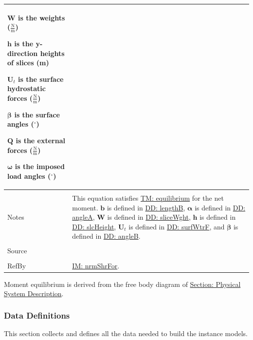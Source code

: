 \documentclass[12pt]{article}
\begin{document}
\begin{minipage}{\textwidth}
\begin{tabular}{p{} p{}}
\begin{symbDescription}
              \item{$\mathbf{W}$ is the weights ($\frac{\text{N}}{\text{m}}$)}
              \item{$\mathbf{h}$ is the y-direction heights of slices (m)}
              \item{${\mathbf{U}_{t}}$ is the surface hydrostatic forces ($\frac{\text{N}}{\text{m}}$)}
              \item{$\mathbf{β}$ is the surface angles (${}^{\circ}$)}
              \item{$\mathbf{Q}$ is the external forces ($\frac{\text{N}}{\text{m}}$)}
              \item{$\mathbf{ω}$ is the imposed load angles (${}^{\circ}$)}
              \end{symbDescription}
\\ \midrule \\
Notes & This equation satisfies \hyperref[TM:equilibrium]{TM: equilibrium} for the net moment. $\mathbf{b}$ is defined in \hyperref[DD:lengthB]{DD: lengthB}, $\mathbf{α}$ is defined in \hyperref[DD:angleA]{DD: angleA}, $\mathbf{W}$ is defined in \hyperref[DD:sliceWght]{DD: sliceWght}, $\mathbf{h}$ is defined in \hyperref[DD:slcHeight]{DD: slcHeight}, ${\mathbf{U}_{t}}$ is defined in \hyperref[DD:surfWtrF]{DD: surfWtrF}, and $\mathbf{β}$ is defined in \hyperref[DD:angleB]{DD: angleB}.
\\ \midrule \\
Source & \cite{chen2005}
\\ \midrule \\
RefBy & \hyperref[IM:nrmShrFor]{IM: nrmShrFor}.
\\ \bottomrule \end{tabular}
\end{minipage}
Moment equilibrium is derived from the free body diagram of \hyperref[Sec:PhysSyst]{Section: Physical System Description}.
\subsubsection{Data Definitions}
\label{Sec:DDs}
This section collects and defines all the data needed to build the instance models.
\par~
\end{document}
